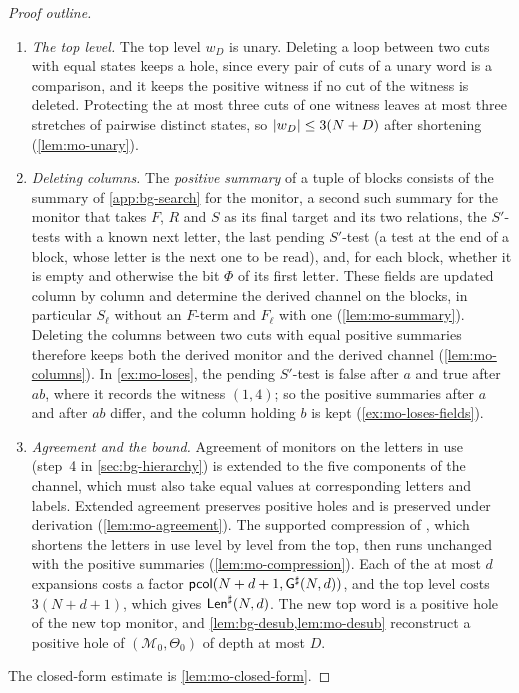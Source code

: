 \begin{proof}[Proof outline]
\begin{enumerate}[leftmargin=*]
\item \emph{The top level.} The top level $w_D$ is unary. Deleting a loop
  between two cuts with equal states keeps a hole, since every pair of cuts of
  a unary word is a comparison, and it keeps the positive witness if no cut of
  the witness is deleted. Protecting the
  at most three cuts of one witness leaves at most three stretches of
  pairwise distinct states, so $\lvert w_D\rvert\le3(N+D)$ after shortening
  (\cref{lem:mo-unary}).
\item \emph{Deleting columns.} The \emph{positive summary} of a tuple of blocks
  consists of the summary of \cref{app:bg-search} for the monitor, a second
  such summary for the monitor that takes $F$, $R$ and $S$ as its final
  target and its two relations, the $S'$-tests with a known next letter, the
  last pending $S'$-test (a test at the end of a block, whose letter is the
  next one to be read), and, for each block, whether it is empty and otherwise
  the bit $\Phi$ of its first letter. These fields are updated column by
  column and determine the derived channel on the blocks, in particular
  $S_\ell$ without an $F$-term and $F_\ell$ with one (\cref{lem:mo-summary}). Deleting the columns between two cuts with equal
  positive summaries therefore keeps both the derived monitor and the derived
  channel (\cref{lem:mo-columns}). In \cref{ex:mo-loses}, the pending
  $S'$-test is false after $a$ and true after $ab$, where it records the
  witness $(1,4)$; so the positive summaries after $a$ and after $ab$ differ,
  and the column holding $b$ is kept (\cref{ex:mo-loses-fields}).
\item \emph{Agreement and the bound.} Agreement of monitors on the letters in
  use (step~4 in \cref{sec:bg-hierarchy}) is extended to the five components
  of the channel, which must also take equal values at corresponding letters
  and labels. Extended agreement preserves positive holes and is preserved
  under derivation (\cref{lem:mo-agreement}). The supported compression of
  \citet{Zhao26}, which shortens the letters in use level by level from the top,
  then runs unchanged with the positive summaries (\cref{lem:mo-compression}).
  Each of the at most $d$ expansions costs a factor
  $\mathsf{pcol}(N+d+1,\mathsf{G}^{\sharp}(N,d))$, and the top level costs $3(N+d+1)$, which
  gives $\mathsf{Len}^{\sharp}(N,d)$. The new top word is a positive hole of the new top
  monitor, and \cref{lem:bg-desub,lem:mo-desub} reconstruct a positive hole of
  $(\mathcal M_0,\Theta_0)$ of depth at most $D$.
\end{enumerate}
The closed-form estimate is \cref{lem:mo-closed-form}.
\end{proof}

